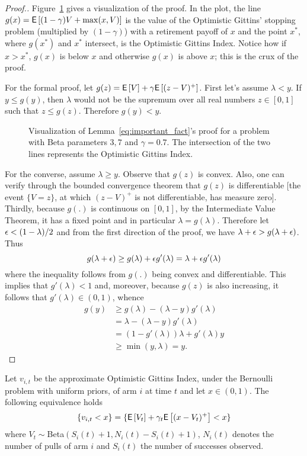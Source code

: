 \begin{proof}[Proof.]
	Figure~\ref{fig:visaulize_gx_proof} gives a visualization of the proof. In the plot, the line $g(x) = \mathsf{E} \left[  (1-\gamma) V + \max(x, V) \right]$  is the  value of the Optimistic Gittins' stopping problem (multiplied by $(1-\gamma)$) with a retirement payoff of $x$ and the point $x^*$, where $g(x^*)$ and $x^*$ intersect, is the Optimistic Gittins Index. Notice how if $x > x^*$, $g(x)$ is below $x$ and otherwise $g(x)$ is above $x$; this is the crux of the proof.
	
	For the formal proof, let $g(z) = \mathsf{E} \left[ V \right] + \gamma \mathsf{E} \left[ (z - V)^+ \right]$. First let's assume $\lambda < y$. If $y \le g(y)$, then $\lambda$ would not be the supremum over all real numbers $z \in [0,1]$ such that $ z \le g(z)$. Therefore $g(y) < y$.
	
	\begin{figure}
		\centering
		
		\caption{Visualization of Lemma~\ref{eq:important_fact}'s proof for a problem with Beta parameters $3,7$ and $\gamma=0.7$. The intersection of the two lines represents the Optimistic Gittins Index.}
		\label{fig:visaulize_gx_proof}
	\end{figure}
	
	For the converse, assume $\lambda \ge y$. Observe that $g(z)$ is convex. Also, one can verify through the bounded convergence theorem that $g(z)$ is differentiable [the event $\{V=z\}$, at which $(z-V)^+$ is not differentiable, has measure zero]. Thirdly, because $g(.)$ is continuous on $[0,1]$, by the Intermediate Value Theorem, it has a fixed point and in particular $\lambda =g(\lambda)$. Therefore let $\epsilon < (1-\lambda)/2$ and from the first direction of the proof, we have $\lambda + \epsilon > g(\lambda + \epsilon)$. Thus
	\[
	g(\lambda + \epsilon) \ge g(\lambda) + \epsilon g'(\lambda) = \lambda + \epsilon g'(\lambda)
	\]
	where the inequality follows from $g(.)$ being convex and differentiable. This implies that $g'(\lambda) < 1$ and, moreover, because $g(z)$ is also increasing, it follows that $g'(\lambda) \in (0,1)$, whence
	\begin{align*}
	g(y) & \ge g(\lambda) - (\lambda - y) g'(\lambda) \\
	& = \lambda - (\lambda - y) g'(\lambda) \\
	& = (1-g'(\lambda)) \lambda + g'(\lambda) y \\
	& \ge \min(y,\lambda) = y.
	\end{align*}
\end{proof}
\begin{corollary} \label{cor:equivalent_event}
	Let $v_{i,t}$ be the approximate Optimistic Gittins Index, under the Bernoulli problem with uniform priors, of arm $i$ at time $t$ and let $x \in (0,1)$. The following equivalence holds
	\[
	\{v_{i,t} < x \} = \{\mathsf{E} \left[ V_t \right] + \gamma_t \mathsf{E} \left[ (x-V_t)^+ \right] < x\}\]
	where $V_t \sim $Beta$(S_i(t)+1,N_i(t) - S_i(t) + 1)$, $N_i(t)$ denotes the number of pulls of arm $i$ and $S_i(t)$ the number of successes observed.
\end{corollary}
